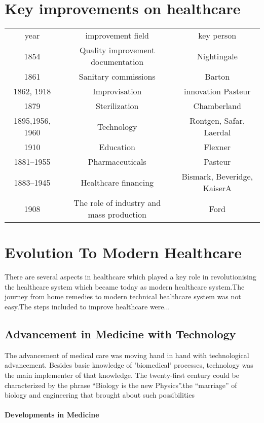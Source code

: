 \documentclass[12pt]{article}
\begin{document}
\section{Key improvements on healthcare}


\begin{tabular}{c c c }

year&improvement field&key person\\

1854&Quality improvement documentation&
Nightingale\\
1861&Sanitary commissions&Barton\\
1862, 1918&Improvisation&innovation	Pasteur\\
1879&Sterilization&Chamberland\\
1895,1956, 1960&Technology	&Rontgen, Safar, Laerdal\\
1910&Education&Flexner\\
1881–1955&Pharmaceuticals&Pasteur\\
1883–1945&Healthcare financing&Bismark, Beveridge, KaiserA\\
1908&The role of industry and mass production&Ford\\

\end{tabular}


\section{Evolution To Modern Healthcare}

There are several aspects in healthcare which played a key role in revolutionising the healthcare system which became today as modern healthcare system.The journey from home remedies to modern technical healthcare system was not easy.The steps included to improve healthcare were...

\subsection{Advancement in Medicine with Technology} 


The advancement of medical care was moving hand in hand with technological advancement. Besides basic knowledge of 'biomedical' processes, technology was the main implementer of that knowledge. The twenty-first century could be characterized by the phrase “Biology is the new Physics”.the “marriage” of biology and engineering that brought about such possibilities


\paragraph{Developments in Medicine}
\end{document}

